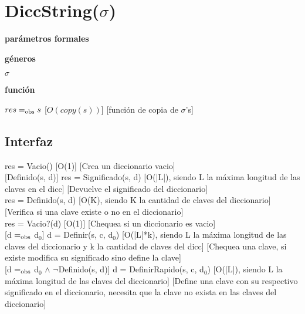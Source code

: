 \section{DiccString($\sigma$)}

\textbf{parámetros formales}\parindent\\
\parbox{1.7cm}{\textbf{géneros}}  $\sigma$\\
\parbox[t]{1.7cm}{\textbf{función}}\parbox[t]{\textwidth-2\parindent-1.7cm}{%
{$res =_{\mathrm{obs}} s$}
[$O(copy(s))$]
[función de copia de $\sigma$'s]
}

\subsection{Interfaz}

{res = Vacio()}
[O(1)]
[Crea un diccionario vacio]\\

[Definido(s, d)]
{res = Significado(s, d)}
[O(|L|), siendo L la máxima longitud de las claves en el dicc]
[Devuelve el significado del diccionario]\\

{res = Definido(s, d)}
[O(K), siendo K la cantidad de claves del diccionario]
[Verifica si una clave existe o no en el diccionario]\\

{res = Vacio?(d)}
[O(1)]
[Chequea si un diccionario es vacio]\\

[d $=_{\mathrm{obs}}$ d$_0$]
{d = Definir(s, c, d$_0$)}
[O(|L|*k), siendo L la máxima longitud de las claves del diccionario y k la cantidad de claves del dicc]
[Chequea una clave, si existe modifica su significado sino define la clave]\\

[d $=_{\mathrm{obs}}$ d$_0$ $\wedge$ $\neg$Definido(s, d)]
{d = DefinirRapido(s, c, d$_0$)}
[O(|L|), siendo L la máxima longitud de las claves del diccionario]
[Define una clave con su respectivo significado en el diccionario, necesita que la clave no exista en las claves del diccionario]\\

